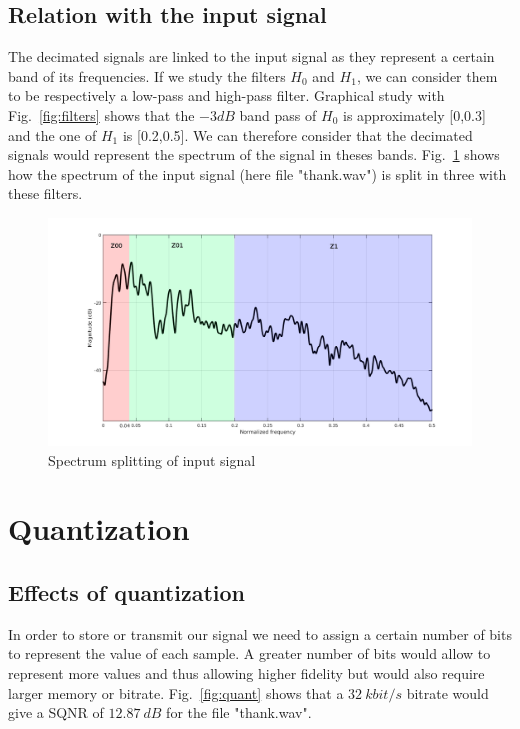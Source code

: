 \documentclass[a4paper,twocolumn]{article}
\begin{document}
\subsection{Relation with the input signal}
The decimated signals are linked to the input signal as they represent a certain band of its frequencies. If we study the filters $H_{0}$ and $H_{1}$, we can consider them to be respectively a low-pass and high-pass filter. Graphical study with Fig.~\ref{fig:filters} shows that the $-3dB$ band pass of $H_{0}$ is approximately [0,0.3] and the one of $H_{1}$ is [0.2,0.5]. We can therefore consider that the decimated signals would represent the spectrum of the signal in theses bands. Fig.~\ref{fig:spect} shows how the spectrum of the input signal (here file "thank.wav") is split in three with these filters.

\begin{figure}[!ht]
  \begin{center}
    \includegraphics[width=1.1\columnwidth]{Thank_spectrum3.png}
  \end{center}
  \caption{Spectrum splitting of input signal}
  \label{fig:spect}
\end{figure}



\section{Quantization}
\label{sec:quantization}

\subsection{Effects of quantization}
\label{sec:quantizationeffect}
In order to store or transmit our signal we need to assign a certain number of bits to represent the value of each sample. A greater number of bits would allow to represent more values and thus allowing higher fidelity but would also require larger memory or bitrate. Fig.~\ref{fig:quant} shows that a $32~kbit/s$ bitrate would give a SQNR of $12.87~dB$ for the file "thank.wav".
\end{document}
